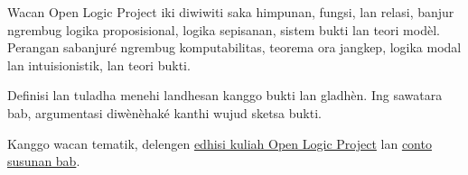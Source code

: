 \documentclass[../include/open-logic-part]{subfiles}
\begin{document}
\clearpage

\begin{editorial}
Wacan Open Logic Project iki diwiwiti saka himpunan, fungsi,
lan relasi, banjur ngrembug logika proposisional, logika sepisanan,
sistem bukti lan teori modèl. Perangan sabanjuré ngrembug komputabilitas,
teorema ora jangkep, logika modal lan intuisionistik, lan teori bukti.

Definisi lan tuladha menehi landhesan kanggo bukti lan gladhèn.
Ing sawatara bab, argumentasi diwènèhaké kanthi wujud sketsa bukti.

Kanggo wacan tematik, delengen
\href{http://builds.openlogicproject.org/}{edhisi kuliah Open Logic Project}
lan \href{https://github.com/OpenLogicProject/OpenLogic/tree/master/courses/sample}{conto susunan bab}.
\end{editorial}


















\end{document}
